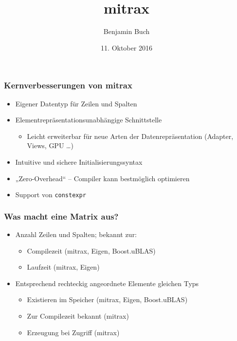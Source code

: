 \documentclass{beamer}
\title{mitrax}
\author{Benjamin Buch}
\date{11. Oktober 2016}
\begin{document}
\begin{frame}
    \frametitle{Kernverbesserungen von mitrax}
    \begin{itemize}
        \item Eigener Datentyp für Zeilen und Spalten
        \item Elementrepräsentationsunabhängige Schnittstelle
        \begin{itemize}
            \item Leicht erweiterbar für neue Arten der Datenrepräsentation (Adapter, Views, GPU …)
        \end{itemize}
        \item Intuitive und sichere Initialisierungssyntax
        \item „Zero-Overhead“ – Compiler kann bestmöglich optimieren
        \item Support von \texttt{constexpr}
    \end{itemize}
\end{frame}
\begin{frame}
    \frametitle{Was macht eine Matrix aus?}
    \begin{itemize}
        \item Anzahl Zeilen und Spalten; bekannt zur:
        \begin{itemize}
            \item Compilezeit (mitrax, Eigen, Boost.uBLAS)
            \item Laufzeit (mitrax, Eigen)
        \end{itemize}
        \item Entsprechend rechteckig angeordnete Elemente gleichen Typs
        \begin{itemize}
            \item Existieren im Speicher (mitrax, Eigen, Boost.uBLAS)
            \item Zur Compilezeit bekannt (mitrax)
            \item Erzeugung bei Zugriff (mitrax)
        \end{itemize}
    \end{itemize}
\end{frame}
\end{document}
